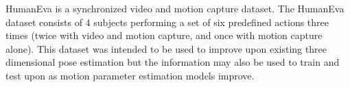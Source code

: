 HumanEva is a synchronized video and motion capture dataset. The HumanEva dataset \cite{sigal_humaneva:_2010} consists of 4 subjects performing a set of six predefined actions three times (twice with video and motion capture, and once with motion capture alone). This dataset was intended to be used to improve upon existing three dimensional pose estimation but the information may also be used to train and test upon as motion parameter estimation models improve.

